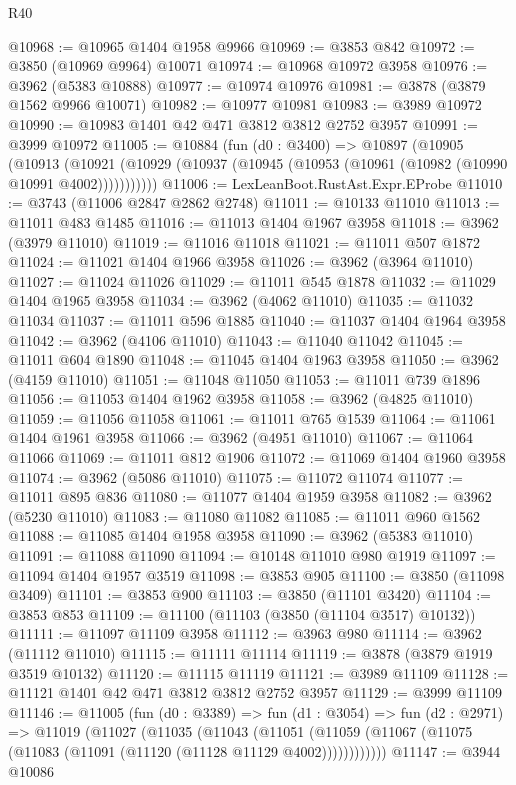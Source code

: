 \begin{lexlean}{R40}
\begin{coremodule}
@10968 := @10965 @1404 @1958 @9966
@10969 := @3853 @842
@10972 := @3850 (@10969 @9964) @10071
@10974 := @10968 @10972 @3958
@10976 := @3962 (@5383 @10888)
@10977 := @10974 @10976
@10981 := @3878 (@3879 @1562 @9966 @10071)
@10982 := @10977 @10981
@10983 := @3989 @10972
@10990 := @10983 @1401 @42 @471 @3812 @3812 @2752 @3957
@10991 := @3999 @10972
@11005 := @10884
    (fun (d0 : @3400) =>
    @10897
      (@10905
        (@10913
          (@10921 (@10929 (@10937 (@10945 (@10953 (@10961 (@10982 (@10990 @10991 @4002)))))))))))
@11006 := LexLeanBoot.RustAst.Expr.EProbe
@11010 := @3743 (@11006 @2847 @2862 @2748)
@11011 := @10133 @11010
@11013 := @11011 @483 @1485
@11016 := @11013 @1404 @1967 @3958
@11018 := @3962 (@3979 @11010)
@11019 := @11016 @11018
@11021 := @11011 @507 @1872
@11024 := @11021 @1404 @1966 @3958
@11026 := @3962 (@3964 @11010)
@11027 := @11024 @11026
@11029 := @11011 @545 @1878
@11032 := @11029 @1404 @1965 @3958
@11034 := @3962 (@4062 @11010)
@11035 := @11032 @11034
@11037 := @11011 @596 @1885
@11040 := @11037 @1404 @1964 @3958
@11042 := @3962 (@4106 @11010)
@11043 := @11040 @11042
@11045 := @11011 @604 @1890
@11048 := @11045 @1404 @1963 @3958
@11050 := @3962 (@4159 @11010)
@11051 := @11048 @11050
@11053 := @11011 @739 @1896
@11056 := @11053 @1404 @1962 @3958
@11058 := @3962 (@4825 @11010)
@11059 := @11056 @11058
@11061 := @11011 @765 @1539
@11064 := @11061 @1404 @1961 @3958
@11066 := @3962 (@4951 @11010)
@11067 := @11064 @11066
@11069 := @11011 @812 @1906
@11072 := @11069 @1404 @1960 @3958
@11074 := @3962 (@5086 @11010)
@11075 := @11072 @11074
@11077 := @11011 @895 @836
@11080 := @11077 @1404 @1959 @3958
@11082 := @3962 (@5230 @11010)
@11083 := @11080 @11082
@11085 := @11011 @960 @1562
@11088 := @11085 @1404 @1958 @3958
@11090 := @3962 (@5383 @11010)
@11091 := @11088 @11090
@11094 := @10148 @11010 @980 @1919
@11097 := @11094 @1404 @1957 @3519
@11098 := @3853 @905
@11100 := @3850 (@11098 @3409)
@11101 := @3853 @900
@11103 := @3850 (@11101 @3420)
@11104 := @3853 @853
@11109 := @11100 (@11103 (@3850 (@11104 @3517) @10132))
@11111 := @11097 @11109 @3958
@11112 := @3963 @980
@11114 := @3962 (@11112 @11010)
@11115 := @11111 @11114
@11119 := @3878 (@3879 @1919 @3519 @10132)
@11120 := @11115 @11119
@11121 := @3989 @11109
@11128 := @11121 @1401 @42 @471 @3812 @3812 @2752 @3957
@11129 := @3999 @11109
@11146 := @11005
    (fun (d0 : @3389) =>
    fun (d1 : @3054) =>
    fun (d2 : @2971) =>
    @11019
      (@11027
        (@11035
          (@11043
            (@11051 (@11059 (@11067 (@11075 (@11083 (@11091 (@11120 (@11128 @11129 @4002))))))))))))
@11147 := @3944 @10086

\end{coremodule}
\end{lexlean}
